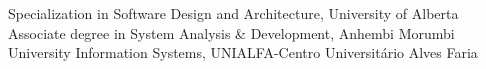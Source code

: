 
\begin{scholarship}
					{Specialization in Software Design and Architecture, University of Alberta}
					{Associate degree in System Analysis \& Development, Anhembi Morumbi University}
					{Information Systems, UNIALFA-Centro Universitário Alves Faria}
\end{scholarship}
